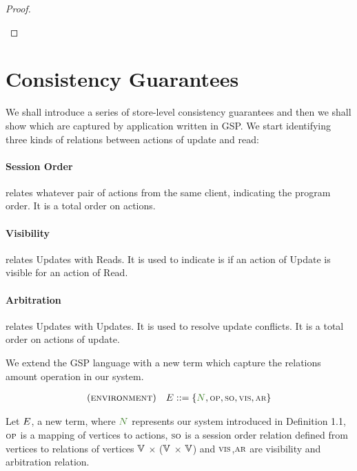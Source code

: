 \documentclass[envcountsect,runningheads,orivec]{llncs}
\begin{document}
\begin{proof}
\begin{itemize}
\begin{itemize}
\begin{enumerate}
						\end{enumerate}
		

				
			\end{itemize}
		\end{itemize}
		
\end{proof}


\section{Consistency Guarantees}
\label{sec:properties-gsp}

We shall introduce a series of store-level consistency guarantees and then we shall show which are captured by application written in GSP. We start identifying three kinds of relations between actions of update and read:

 \paragraph{Session Order} relates whatever pair of actions from the same client, indicating the program order. It is a total order on actions. 

 \paragraph{Visibility} relates Updates with Reads. It is used to indicate is if an action of Update is visible for an action of Read.

 \paragraph{Arbitration} relates Updates with Updates. It is used to resolve update conflicts. It is a total order on actions of update.




We extend the GSP language with a new term which capture the relations amount operation in our system. 
 
\[
    \begin{array}{l@{\quad}r@{\;::=\;}l}
			 (\textsc{environment}) & \environmentterm &  \environment{\systemterm}{\op}{\so}{\vis}{\arb} \\
	    \end{array}
  \]
	
Let $E$, a new term, where $\systemterm$ represents our system introduced in Definition 1.1, $\textsc{\scriptsize{OP}}$ is a mapping of vertices to actions, $\textsc{\scriptsize{SO}}$ is a session order relation defined from vertices to relations of vertices $\mathbb{V}$ $\times$ ($\mathbb{V}$ $\times$ $\mathbb{V}$) and $\textsc{\scriptsize{VIS}}$,$\textsc{\scriptsize{AR}}$ are visibility and arbitration relation.
\end{document}
